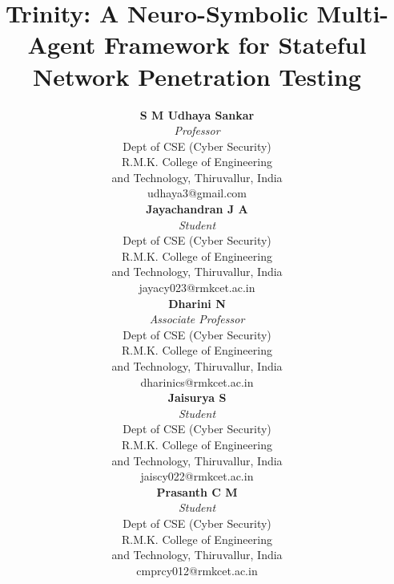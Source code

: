 \documentclass[conference]{IEEEtran}
\begin{document}
\title{Trinity: A Neuro-Symbolic Multi-Agent Framework for Stateful Network Penetration Testing}

\author{%
\begin{minipage}[t]{0.30\textwidth}
\centering
\textbf{S M Udhaya Sankar}\\
\textit{Professor}\\
Dept of CSE (Cyber Security)\\
R.M.K. College of Engineering\\
and Technology, Thiruvallur, India\\
{\small udhaya3@gmail.com}

\vspace{0.4cm}

\textbf{Jayachandran J A}\\
\textit{Student}\\
Dept of CSE (Cyber Security)\\
R.M.K. College of Engineering\\
and Technology, Thiruvallur, India\\
{\small jayacy023@rmkcet.ac.in}
\end{minipage}%
\hfill
\begin{minipage}[t]{0.30\textwidth}
\centering
\textbf{Dharini N}\\
\textit{Associate Professor}\\
Dept of CSE (Cyber Security)\\
R.M.K. College of Engineering\\
and Technology, Thiruvallur, India\\
{\small dharinics@rmkcet.ac.in}
\end{minipage}%
\hfill
\begin{minipage}[t]{0.30\textwidth}
\centering
\textbf{Jaisurya S}\\
\textit{Student}\\
Dept of CSE (Cyber Security)\\
R.M.K. College of Engineering\\
and Technology, Thiruvallur, India\\
{\small jaiscy022@rmkcet.ac.in}

\vspace{0.4cm}

\textbf{Prasanth C M}\\
\textit{Student}\\
Dept of CSE (Cyber Security)\\
R.M.K. College of Engineering\\
and Technology, Thiruvallur, India\\
{\small cmprcy012@rmkcet.ac.in}
\end{minipage}%
}
\end{document}
